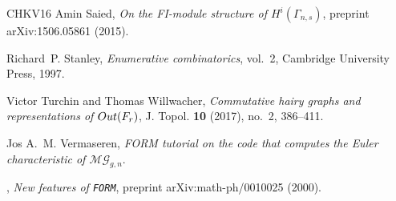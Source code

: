 \documentclass[oneside]{amsart}
\theoremstyle{remark}
\begin{document}
\begin{thebibliography}{CHKV16}
Amin Saied, \emph{On the {FI}-module structure of {$H^i(\Gamma_{n,s})$}},
  preprint arXiv:1506.05861 (2015).

Richard~P. Stanley, \emph{Enumerative combinatorics}, vol.~2, Cambridge
  University Press, 1997.

Victor Turchin and Thomas Willwacher, \emph{Commutative hairy graphs and
  representations of {${\rm Out}(F_r)$}}, J. Topol. \textbf{10} (2017), no.~2,
  386--411. 

Jos A.~M. Vermaseren, \emph{{FORM} tutorial on the code that computes the
  {Euler} characteristic of {$\mathcal {MG}_{g,n}$}}.

\bysame, \emph{{New features of \texttt{FORM}}}, preprint arXiv:math-ph/0010025
  (2000).

\end{thebibliography}
\end{document}

